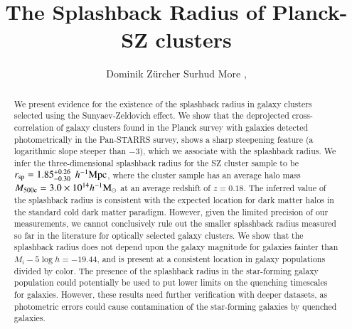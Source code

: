 \documentclass[iop, apjl, twocolappendix, numberedappendix]{emulateapj}
\def\mpch{h^{-1}{\rm Mpc}}
\def\msunh{h^{-1}{\rm M_{\odot}}}
\begin{document}
\title{The Splashback Radius of Planck-SZ clusters}

\author{
Dominik Zürcher 
Surhud More , 
}

\begin{abstract}
We present evidence for the existence of the splashback radius in
galaxy clusters selected using the Sunyaev-Zeldovich effect.  We show
that the deprojected cross-correlation of galaxy clusters found in the
Planck survey with galaxies detected photometrically in the Pan-STARRS
survey, shows a sharp steepening feature (a logarithmic slope steeper
than $-3$), which we associate with the splashback radius. We infer
the three-dimensional splashback radius for the SZ cluster sample to
be $r_{\rm sp}=1.85_{-0.30}^{+0.26}$ $\mpch$, where the cluster sample
has an average halo mass $M_{\rm 500c}=3.0\times10^{14}\msunh$ at an
average redshift of $z=0.18$.  The inferred value of the splashback
radius is consistent with the expected location for dark matter halos
in the standard cold dark matter paradigm. However, given the limited
precision of our measurements, we cannot conclusively rule out the
smaller splashback radius measured so far in the literature for
optically selected galaxy clusters. We show that the splashback radius
does not depend upon the galaxy magnitude for galaxies fainter than
$M_i-5\log h=-19.44$, and is present at a consistent location in
galaxy populations divided by color. The presence of the splashback
radius in the star-forming galaxy population could potentially be used
to put lower limits on the quenching timescales for galaxies. However,
these results need further verification with deeper datasets, as
photometric errors could cause contamination of the star-forming
galaxies by quenched galaxies.

\end{abstract}

\end{document}
